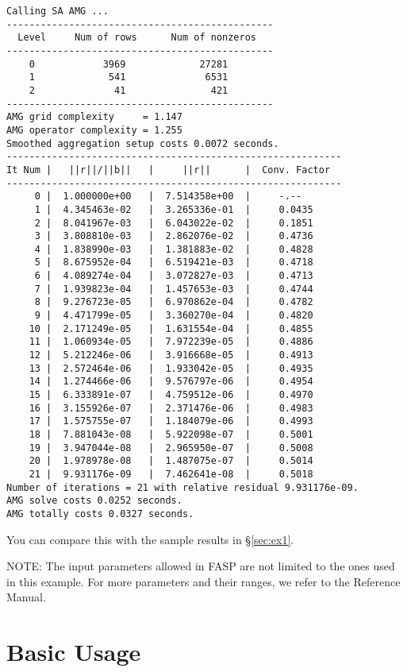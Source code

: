 \documentclass[11pt]{memoir}
\begin{document}
\begin{lstlisting}[numbers=none]
Calling SA AMG ...
-----------------------------------------------
  Level     Num of rows      Num of nonzeros
-----------------------------------------------
    0            3969             27281
    1             541              6531
    2              41               421
-----------------------------------------------
AMG grid complexity     = 1.147
AMG operator complexity = 1.255
Smoothed aggregation setup costs 0.0072 seconds.
-----------------------------------------------------------
It Num |   ||r||/||b||   |     ||r||      |  Conv. Factor
-----------------------------------------------------------
     0 |  1.000000e+00   |  7.514358e+00  |     -.--
     1 |  4.345463e-02   |  3.265336e-01  |     0.0435
     2 |  8.041967e-03   |  6.043022e-02  |     0.1851
     3 |  3.808810e-03   |  2.862076e-02  |     0.4736
     4 |  1.838990e-03   |  1.381883e-02  |     0.4828
     5 |  8.675952e-04   |  6.519421e-03  |     0.4718
     6 |  4.089274e-04   |  3.072827e-03  |     0.4713
     7 |  1.939823e-04   |  1.457653e-03  |     0.4744
     8 |  9.276723e-05   |  6.970862e-04  |     0.4782
     9 |  4.471799e-05   |  3.360270e-04  |     0.4820
    10 |  2.171249e-05   |  1.631554e-04  |     0.4855
    11 |  1.060934e-05   |  7.972239e-05  |     0.4886
    12 |  5.212246e-06   |  3.916668e-05  |     0.4913
    13 |  2.572464e-06   |  1.933042e-05  |     0.4935
    14 |  1.274466e-06   |  9.576797e-06  |     0.4954
    15 |  6.333891e-07   |  4.759512e-06  |     0.4970
    16 |  3.155926e-07   |  2.371476e-06  |     0.4983
    17 |  1.575755e-07   |  1.184079e-06  |     0.4993
    18 |  7.881043e-08   |  5.922098e-07  |     0.5001
    19 |  3.947044e-08   |  2.965950e-07  |     0.5008
    20 |  1.978978e-08   |  1.487075e-07  |     0.5014
    21 |  9.931176e-09   |  7.462641e-08  |     0.5018
Number of iterations = 21 with relative residual 9.931176e-09.
AMG solve costs 0.0252 seconds.
AMG totally costs 0.0327 seconds.
\end{lstlisting}
%
You can compare this with the sample results in \S\ref{sec:ex1}.

\begin{snugshade}\noindent
NOTE: The input parameters allowed in FASP are not limited to the ones used in this example. For more parameters and their ranges, we refer to the Reference Manual.
\end{snugshade}

\chapter{Basic Usage}\label{ch:basic}
\end{document}
